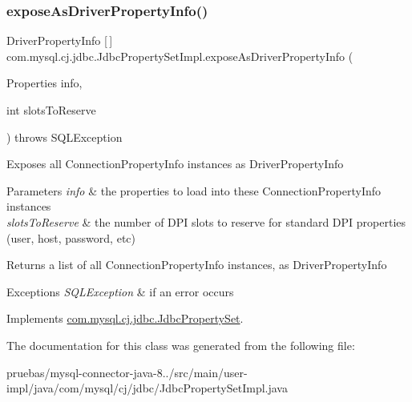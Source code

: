 \subsubsection{\texorpdfstring{expose\+As\+Driver\+Property\+Info()}{exposeAsDriverPropertyInfo()}}
{\footnotesize\ttfamily Driver\+Property\+Info \mbox{[}$\,$\mbox{]} com.\+mysql.\+cj.\+jdbc.\+Jdbc\+Property\+Set\+Impl.\+expose\+As\+Driver\+Property\+Info (\begin{DoxyParamCaption}\item[{Properties}]{info,  }\item[{int}]{slots\+To\+Reserve }\end{DoxyParamCaption}) throws S\+Q\+L\+Exception}

Exposes all Connection\+Property\+Info instances as Driver\+Property\+Info


\begin{DoxyParams}{Parameters}
{\em info} & the properties to load into these Connection\+Property\+Info instances \\
\hline
{\em slots\+To\+Reserve} & the number of D\+PI slots to reserve for \textquotesingle{}standard\textquotesingle{} D\+PI properties (user, host, password, etc)\\
\hline
\end{DoxyParams}
\begin{DoxyReturn}{Returns}
a list of all Connection\+Property\+Info instances, as Driver\+Property\+Info
\end{DoxyReturn}

\begin{DoxyExceptions}{Exceptions}
{\em S\+Q\+L\+Exception} & if an error occurs \\
\hline
\end{DoxyExceptions}


Implements \mbox{\hyperlink{interfacecom_1_1mysql_1_1cj_1_1jdbc_1_1_jdbc_property_set_a3d74db3873b64c6ed704a443e9993359}{com.\+mysql.\+cj.\+jdbc.\+Jdbc\+Property\+Set}}.



The documentation for this class was generated from the following file\+:\begin{DoxyCompactItemize}
\item 
pruebas/mysql-\/connector-\/java-\/8../src/main/user-\/impl/java/com/mysql/cj/jdbc/Jdbc\+Property\+Set\+Impl.\+java\end{DoxyCompactItemize}
